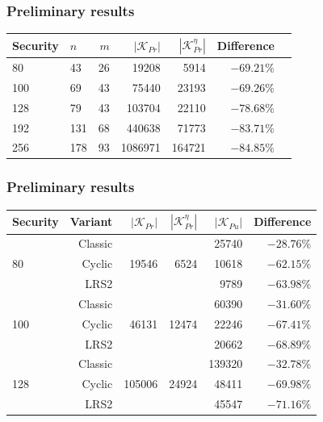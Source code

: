 \documentclass[12pt]{beamer}
\begin{document}
\begin{frame}
  \frametitle{Preliminary results~\cite{Zambonin:inproc:2019:jul}}
  \begin{table}[htbp]
    \renewcommand{\arraystretch}{1.2}
    \setlength{\tabcolsep}{8pt}
    \centering
    \begin{tabular}{*{2}{l}*{5}{r}}
      \toprule
      Security & $n$ & $m$ & $|\mathcal{K}_{Pr}|$
        & $|\mathcal{K}_{Pr} ^{\eta}|$ & Difference \\ \midrule
       80  &    43 &   26 &    19208 &    5914 & $-69.21\%$ \\
      100  &    69 &   43 &    75440 &   23193 & $-69.26\%$ \\
      128  &    79 &   43 &   103704 &   22110 & $-78.68\%$ \\
      192  &   131 &   68 &   440638 &   71773 & $-83.71\%$ \\
      256  &   178 &   93 &  1086971 &  164721 & $-84.85\%$ \\
      \bottomrule
    \end{tabular}
  \end{table}
\end{frame}

\begin{frame}
  \frametitle{Preliminary results~\cite{Zambonin:inproc:2019:jul}}
  \begin{table}[htbp]
    \renewcommand{\arraystretch}{1.2}
    \setlength{\tabcolsep}{7pt}
    \centering
    \begin{tabular}{*{1}{l}*{5}{r}}
      \toprule
      Security & Variant
        & $|\mathcal{K}_{Pr}|$ & $|\mathcal{K}_{Pr}^{\eta}|$
        & $|\mathcal{K}_{Pu}|$ & Difference \\ \midrule
      \multirow{3}{*}{80}
        &  Classic &  \multirow{3}{*}{ 19546} &  \multirow{3}{*}{ 6524}
                                                &   25740 & $-28.76\%$ \\
        &   Cyclic &                          & &   10618 & $-62.15\%$ \\
        &     LRS2 &                          & &    9789 & $-63.98\%$ \\
      \multirow{3}{*}{100}
        &  Classic &  \multirow{3}{*}{ 46131} &  \multirow{3}{*}{12474}
                                                &   60390 & $-31.60\%$ \\
        &   Cyclic &                          & &   22246 & $-67.41\%$ \\
        &     LRS2 &                          & &   20662 & $-68.89\%$ \\
      \multirow{3}{*}{128}
        &  Classic &  \multirow{3}{*}{105006} &  \multirow{3}{*}{24924}
                                                &  139320 & $-32.78\%$ \\
        &   Cyclic &                          & &   48411 & $-69.98\%$ \\
        &     LRS2 &                          & &   45547 & $-71.16\%$ \\
      \bottomrule
    \end{tabular}
  \end{table}
\end{frame}
\end{document}
